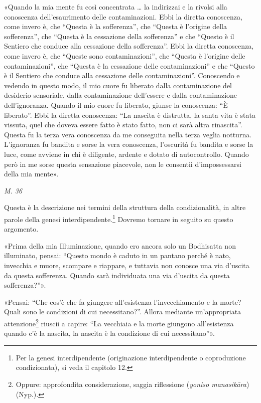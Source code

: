 «Quando la mia mente fu così concentrata …​ la indirizzai e la rivolsi
alla conoscenza dell’esaurimento delle contaminazioni. Ebbi la diretta
conoscenza, come invero è, che “Questa è la sofferenza”, che “Questa è
l’origine della sofferenza”, che “Questa è la cessazione della
sofferenza” e che “Questo è il Sentiero che conduce alla cessazione
della sofferenza”. Ebbi la diretta conoscenza, come invero è, che
“Queste sono contaminazioni”, che “Questa è l’origine delle
contaminazioni”, che “Questa è la cessazione delle contaminazioni” e che
“Questo è il Sentiero che conduce alla cessazione delle contaminazioni”.
Conoscendo e vedendo in questo modo, il mio cuore fu liberato dalla
contaminazione del desiderio sensoriale, dalla contaminazione
dell’essere e dalla contaminazione dell’ignoranza. Quando il mio cuore
fu liberato, giunse la conoscenza: “È liberato”. Ebbi la diretta
conoscenza: “La nascita è distrutta, la santa vita è stata vissuta, quel
che doveva essere fatto è stato fatto, non ci sarà altra rinascita”.
Questa fu la terza vera conoscenza da me conseguita nella terza veglia
notturna. L’ignoranza fu bandita e sorse la vera conoscenza, l’oscurità
fu bandita e sorse la luce, come avviene in chi è diligente, ardente e
dotato di autocontrollo. Quando però in me sorse questa sensazione
piacevole, non le consentii d’impossessarsi della mia mente».


\emph{M. 36}


 Questa è la descrizione nei termini della struttura
della condizionalità, in altre parole della genesi
interdipendente.\footnote{Per la genesi interdipendente (originazione interdipendente o coproduzione condizionata), si veda il capitolo 12.} Dovremo tornare in seguito su questo
argomento.


 «Prima della mia Illuminazione, quando ero ancora solo un
Bodhisatta non illuminato, pensai: “Questo mondo è caduto in un pantano
perché è nato, invecchia e muore, scompare e riappare, e tuttavia non
conosce una via d’uscita da questa sofferenza. Quando sarà individuata
una via d’uscita da questa sofferenza?”».


«Pensai: “Che cos’è che fa giungere all’esistenza l’invecchiamento e la
morte? Quali sono le condizioni di cui necessitano?”. Allora mediante
un’appropriata attenzione\footnote{Oppure: approfondita considerazione, saggia riflessione (\emph{yoniso manasikāra}) (Nyp.).} riuscii a capire: “La
vecchiaia e la morte giungono all’esistenza quando c’è la nascita, la
nascita è la condizione di cui necessitano”».


